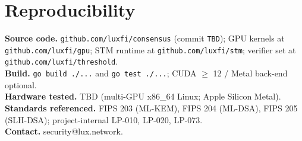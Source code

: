\documentclass[11pt,a4paper]{article}
\begin{document}
\tableofcontents
\newpage























\appendix
\section*{Reproducibility}
\textbf{Source code.} \texttt{github.com/luxfi/consensus} (commit \texttt{TBD}); GPU kernels at \texttt{github.com/luxfi/gpu}; STM runtime at \texttt{github.com/luxfi/stm}; verifier set at \texttt{github.com/luxfi/threshold}.\\
\textbf{Build.} \texttt{go build ./...} and \texttt{go test ./...}; CUDA \(\geq\) 12 / Metal back-end optional.\\
\textbf{Hardware tested.} TBD (multi-GPU x86\_64 Linux; Apple Silicon Metal).\\
\textbf{Standards referenced.} FIPS 203 (ML-KEM), FIPS 204 (ML-DSA), FIPS 205 (SLH-DSA); project-internal LP-010, LP-020, LP-073.\\
\textbf{Contact.} security@lux.network.
\end{document}
